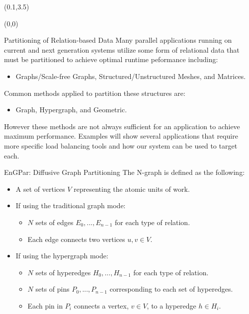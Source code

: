 \documentclass{beamer}
\begin{document}
\begin{textblock}{15.6}(0.1,3.5)
  \begin{textblock}{5}(0,0)
    \begin{block}{\centering Partitioning of Relation-based Data}
      Many parallel applications running on current and next generation systems utilize some form of relational data that must be partitioned to achieve optimal runtime peformance including:
      \begin{itemize}
      \item Graphs/Scale-free Graphs, Structured/Unstructured Meshes, and Matrices.
      \end{itemize}
      Common methods applied to partition these structures are:
      \begin{itemize}
      \item Graph, Hypergraph, and Geometric.
      \end{itemize}
      However these methods are not always sufficient for an application to achieve maximum performance. Examples will show several applications that require more specific load balancing tools and how our system can be used to target each.
    \end{block}
    \begin{block}{\centering EnGPar: Diffusive Graph Partitioning}
      The N-graph is defined as the following:
      \begin{itemize}
      \item A set of vertices $V$ representing the atomic units of work.
      \item If using the traditional graph mode:
        \begin{itemize}
        \item $N$ sets of edges $E_0,...,E_{n-1}$ for each type of relation.
        \item Each edge connects two vertices $u,v \in V$.
        \end{itemize}
      \item If using the hypergraph mode:
        \begin{itemize}
        \item $N$ sets of hyperedges $H_0,...,H_{n-1}$ for each type of relation.
        \item $N$ sets of pins $P_0,...,P_{n-1}$ corresponding to each set of hyperedges.
        \item Each pin in $P_i$ connects a vertex, $v \in V$, to a hyperedge $h \in H_i$.
        \end{itemize}
      \end{itemize}


\end{block}
\end{textblock}
\end{textblock}
\end{document}

